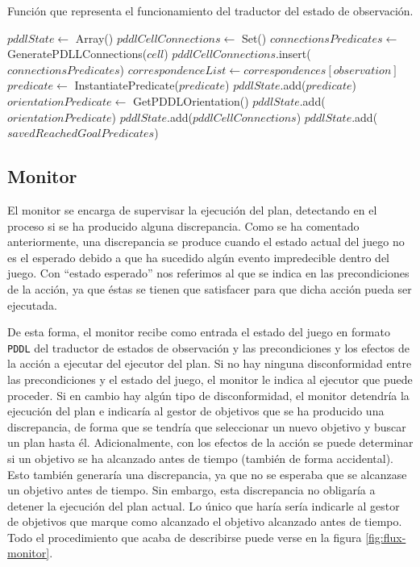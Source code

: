 \begin{algorithm}[H]
\caption{Función que representa el funcionamiento del traductor del estado de observación.}
\label{alg:translator}
\begin{algorithmic}[1]
\State $pddlState \gets $ Array()
\State $pddlCellConnections \gets $ Set()
    \State $connectionsPredicates \gets $ GeneratePDLLConnections($cell$)
    \State $pddlCellConnections$.insert($connectionsPredicates$)
        \State $correspondenceList \gets correspondences[observation]$
            \State $predicate \gets $ InstantiatePredicate($predicate$)
            \State $pddlState$.add($predicate$)
        \EndFor
            \State $orientationPredicate \gets $ GetPDDLOrientation()
            \State $pddlState$.add($orientationPredicate$)
        \EndIf
    \EndFor
\EndFor
\State $pddlState$.add($pddlCellConnections$)
\State $pddlState$.add($savedReachedGoalPredicates$)
\State {}
\EndFunction
\end{algorithmic}
\end{algorithm}

\subsection{Monitor}

El monitor se encarga de supervisar la ejecución del plan, detectando en el proceso si se ha producido
alguna discrepancia. Como se ha comentado anteriormente, una discrepancia se produce cuando el estado
actual del juego no es el esperado debido a que ha sucedido algún evento impredecible dentro del juego.
Con ``estado esperado'' nos referimos al que se indica en las precondiciones de la acción, ya que
éstas se tienen que satisfacer para que dicha acción pueda ser ejecutada.

De esta forma, el monitor recibe como entrada el estado del juego en formato \texttt{PDDL} del
traductor de estados de observación y las precondiciones y los efectos de la acción a ejecutar
del ejecutor del plan. Si no hay ninguna disconformidad entre las precondiciones y el estado del juego,
el monitor le indica al ejecutor que puede proceder. Si en cambio hay algún tipo de disconformidad,
el monitor detendría la ejecución del plan e indicaría al gestor de objetivos que se ha producido
una discrepancia, de forma que se tendría que seleccionar un nuevo objetivo y buscar un plan hasta
él. Adicionalmente, con los efectos de la acción se puede determinar si un objetivo se ha alcanzado
antes de tiempo (también de forma accidental). Esto también generaría una discrepancia, ya que no se
esperaba que se alcanzase un objetivo antes de tiempo. Sin embargo, esta discrepancia no obligaría
a detener la ejecución del plan actual. Lo único que haría sería indicarle al gestor de objetivos
que marque como alcanzado el objetivo alcanzado antes de tiempo. Todo el procedimiento que acaba de describirse
puede verse en la figura \ref{fig:flux-monitor}.

